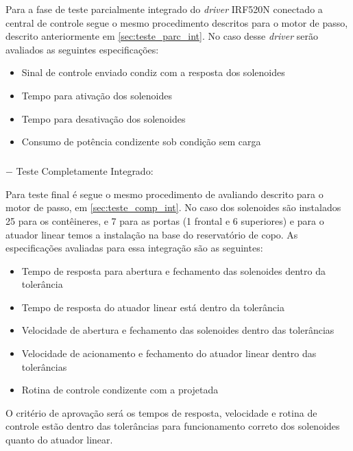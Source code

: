Para a fase de teste parcialmente integrado do \textit{driver} IRF520N conectado a central de controle segue o mesmo procedimento descritos para o motor de passo, descrito anteriormente em \ref{sec:teste_parc_int}. No caso desse \textit{driver} serão avaliados as seguintes especificações: 

\begin{itemize}
    \item Sinal de controle enviado condiz com a resposta dos solenoides
    \item Tempo para ativação dos solenoides
    \item Tempo para desativação dos solenoides
    \item Consumo de potência condizente sob condição sem carga
\end{itemize}

\subparagraph*{} $-$ Teste Completamente Integrado:

Para teste final é segue o mesmo procedimento de avaliando descrito para o motor de passo, em \ref{sec:teste_comp_int}. No caso dos solenoides são instalados 25 para os contêineres, e 7 para as portas (1 frontal e 6 superiores) e para o atuador linear temos a instalação na base do reservatório de copo. As especificações avaliadas para essa integração são as seguintes:

\begin{itemize}
    \item Tempo de resposta para abertura e fechamento das solenoides dentro da tolerância
    \item Tempo de resposta do atuador linear está dentro da tolerância
    \item Velocidade de abertura e fechamento das solenoides dentro das tolerâncias
    \item Velocidade de acionamento e fechamento do atuador linear dentro das tolerâncias 
    \item Rotina de controle condizente com a projetada
\end{itemize}

O critério de aprovação será os tempos de resposta, velocidade e rotina de controle estão dentro das tolerâncias para funcionamento correto dos solenoides quanto do atuador linear.


